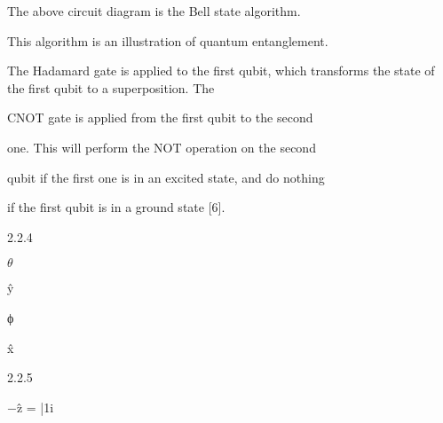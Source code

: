 \documentclass[a4paper,portrait,12pt]{article}
\begin{document}
\begin{flushleft}
The above circuit diagram is the Bell state algorithm.
\end{flushleft}


\begin{flushleft}
This algorithm is an illustration of quantum entanglement.
\end{flushleft}


\begin{flushleft}
The Hadamard gate is applied to the first qubit, which transforms the state of the first qubit to a superposition. The
\end{flushleft}


\begin{flushleft}
CNOT gate is applied from the first qubit to the second
\end{flushleft}


\begin{flushleft}
one. This will perform the NOT operation on the second
\end{flushleft}


\begin{flushleft}
qubit if the first one is in an excited state, and do nothing
\end{flushleft}


\begin{flushleft}
if the first qubit is in a ground state [6].
\end{flushleft}





2.2.4


\begin{flushleft}
$\theta$
\end{flushleft}


\begin{flushleft}
ŷ
\end{flushleft}


\begin{flushleft}
ϕ
\end{flushleft}


\begin{flushleft}
x̂
\end{flushleft}





2.2.5


\begin{flushleft}
$-$ẑ = |1i
\end{flushleft}
\end{document}
